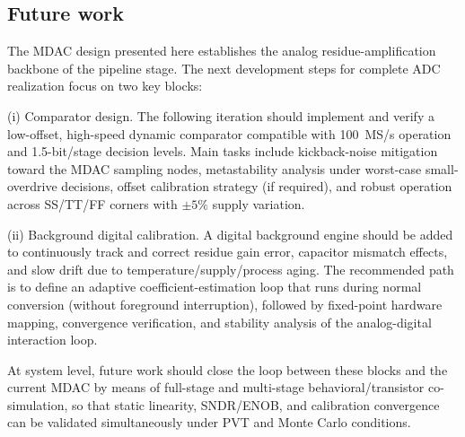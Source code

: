 \documentclass[11pt,a4paper]{article}
\begin{document}
\subsection*{Future work}
The MDAC design presented here establishes the analog residue-amplification backbone of the pipeline stage. The next development steps for complete ADC realization focus on two key blocks:

(i) Comparator design. The following iteration should implement and verify a low-offset, high-speed dynamic comparator compatible with 100~MS/s operation and 1.5-bit/stage decision levels. Main tasks include kickback-noise mitigation toward the MDAC sampling nodes, metastability analysis under worst-case small-overdrive decisions, offset calibration strategy (if required), and robust operation across SS/TT/FF corners with $\pm5\%$ supply variation.

(ii) Background digital calibration. A digital background engine should be added to continuously track and correct residue gain error, capacitor mismatch effects, and slow drift due to temperature/supply/process aging. The recommended path is to define an adaptive coefficient-estimation loop that runs during normal conversion (without foreground interruption), followed by fixed-point hardware mapping, convergence verification, and stability analysis of the analog-digital interaction loop.

At system level, future work should close the loop between these blocks and the current MDAC by means of full-stage and multi-stage behavioral/transistor co-simulation, so that static linearity, SNDR/ENOB, and calibration convergence can be validated simultaneously under PVT and Monte Carlo conditions.



{}
\end{document}
